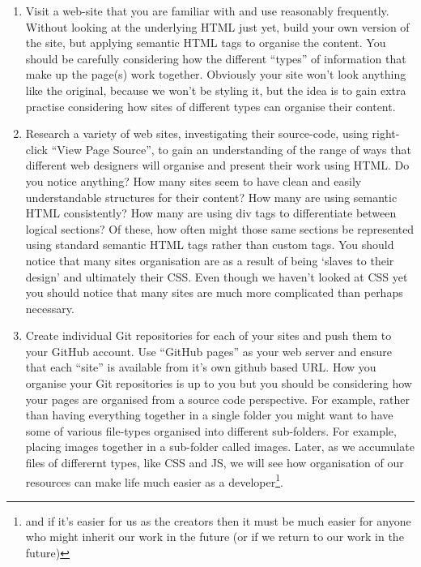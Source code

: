 \documentclass[10pt, a4paper, twosize]{article}
\begin{document}
\begin{enumerate}
\item Visit a web-site that you are familiar with and use reasonably frequently. Without looking at the underlying HTML just yet, build your own version of the site, but applying semantic HTML tags to organise the content. You should be carefully considering how the different ``types'' of information that make up the page(s) work together. Obviously your site won't look anything like the original, because we won't be styling it, but the idea is to gain extra practise considering how sites of different types can organise their content.

\item Research a variety of web sites, investigating their source-code, using right-click ``View Page Source'', to gain an understanding of the range of ways that different web designers will organise and present their work using HTML. Do you notice anything? How many sites seem to have clean and easily understandable structures for their content? How many are using semantic HTML consistently? How many are using div tags to differentiate between logical sections? Of these, how often might those same sections be represented using standard semantic HTML tags rather than custom tags. You should notice that many sites organisation are as a result of being `slaves to their design' and ultimately their CSS. Even though we haven't looked at CSS yet you should notice that many sites are much more complicated than perhaps necessary.

\item Create individual Git repositories for each of your sites and push them to your GitHub account. Use ``GitHub pages'' as your web server and ensure that each ``site'' is available from it's own github based URL. How you organise your Git repositories is up to you but you should be considering how your pages are organised from a source code perspective. For example, rather than having everything together in a single folder you might want to have some of various file-types organised into different sub-folders. For example, placing images together in a sub-folder called images. Later, as we accumulate files of differernt types, like CSS and JS, we will see how organisation of our resources can make life much easier as a developer\footnote{and if it's easier for us as the creators then it must be much easier for anyone who might inherit our work in the future (or if we return to our work in the future)}.

\end{enumerate}
\end{document}
